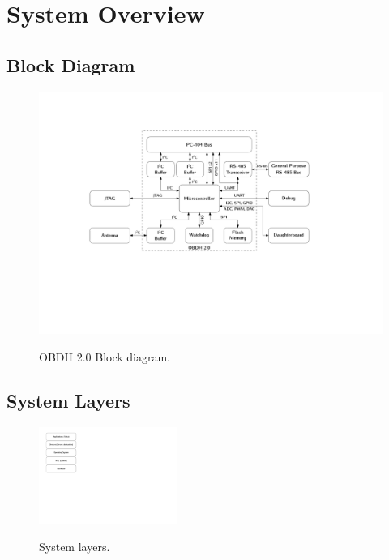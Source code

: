 %
%
%
%
%

%
%
%
%
%
%

\chapter{System Overview} \label{ch:system-overview}

\section{Block Diagram}

\begin{figure}[!ht]
    \begin{center}
        \includegraphics[width=\textwidth]{figures/block_diagram.pdf}
        \label{fig:block-diagram}
        \caption{OBDH 2.0 Block diagram.}
    \end{center}
\end{figure}

\section{System Layers}

\begin{figure}[!ht]
    \begin{center}
        \includegraphics[width=0.4\textwidth]{figures/system_layers.pdf}
        \label{fig:system-layers}
        \caption{System layers.}
    \end{center}
\end{figure}

